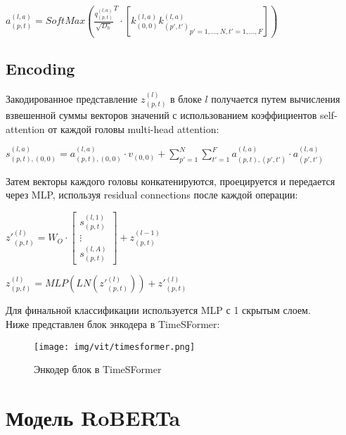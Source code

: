 \documentclass[PMI,VKR]{HSEUniversity}
\begin{document}
\begin{center}
    $a_{(p, t)}^{(l, a)} = SoftMax(\frac{q_{(p, t)}^{(l, a)}}{\sqrt{D_{h}}}^{T} \cdot \left[k_{(0, 0)}^{(l, a)} {k_{(p', t')}^{(l, a)}}_{p' = 1, \dots, N, t' = 1, \dots, F} \right])$
\end{center}

\subsection{Encoding}

Закодированное представление $z_{(p, t)}^{(l)}$ в блоке $l$ получается путем вычисления взвешенной суммы векторов значений с использованием коэффициентов self-attention от каждой головы multi-head attention:

\begin{center}
    $s_{(p, t),(0, 0)}^{(l, a)} = a_{(p, t),(0, 0)}^{(l, a)} \cdot v_{(0, 0)} + \sum\limits_{p'=1}^N \sum\limits_{t'=1}^F a_{(p, t),(p', t')}^{(l, a)} \cdot a_{(p', t')}^{(l, a)}$
\end{center}

Затем векторы каждого головы конкатенируются, проецируется и передается через MLP, используя residual connections после каждой операции:

\begin{center}
    $z'_{(p, t)}^{(l)} = W_{O} \cdot \begin{bmatrix}
            s_{(p, t)}^{(l, 1)} \\
            \vdots              \\
            s_{(p, t)}^{(l, A)}
        \end{bmatrix} + z_{(p, t)}^{(l - 1)}$

    $z_{(p, t)}^{(l)} = MLP(LN(z'_{(p, t)}^{(l)})) + z'_{(p, t)}^{(l)}$
\end{center}

Для финальной классификации используется MLP с 1 скрытым слоем. \\

Ниже представлен блок энкодера в TimeSFormer:

\begin{figure}[h]
    \centering
    \texttt{[image: img/vit/timesformer.png]}
    \caption{Энкодер блок в TimeSFormer}
\end{figure}

\newpage
\section{Модель RoBERTa}
\end{document}
